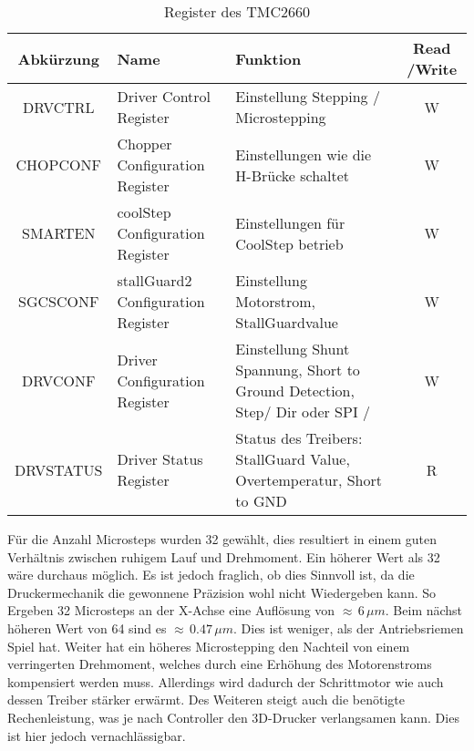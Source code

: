 \begin{table}[h]
	\small
		\begin{center}
		\def\arraystretch{1.3} \tabcolsep=10pt
			\begin{tabular}{|c|C{4cm}|C{5cm}|c|}
				\hline
				Abkürzung	 & 	Name	 & 	Funktion	 & 	Read /Write\\ \hline
				DRVCTRL	 & 	Driver Control Register	 & 	Einstellung Stepping / Microstepping 	 & 	W\\ \hline
				CHOPCONF	 & 	Chopper Configuration Register	 & 	Einstellungen wie die H-Brücke schaltet	 & 	W\\ \hline
				SMARTEN	 & 	coolStep Configuration Register	 & 	Einstellungen für CoolStep betrieb	 & 	W\\ \hline
				SGCSCONF	 & 	stallGuard2 Configuration Register	 & 	Einstellung Motorstrom, StallGuardvalue	 & 	W\\ \hline
				DRVCONF	 & 	Driver Configuration Register	 & 	Einstellung  Shunt Spannung, Short to Ground Detection, Step/		Dir oder SPI / 	 & 	W\\ \hline
				DRVSTATUS	 & 	Driver Status Register	 & 	Status des Treibers: StallGuard Value, Overtemperatur, Short to GND	 & 	R \\ \hline
			\end{tabular} 
		\end{center}
		\caption{Register des TMC2660}
		\label{tab:RegisterTMC}
\end{table}
	
	
Für die Anzahl Microsteps wurden 32 gewählt, dies resultiert in einem guten Verhältnis zwischen ruhigem Lauf und Drehmoment. Ein höherer Wert als 32 wäre durchaus möglich. Es ist jedoch fraglich, ob dies Sinnvoll ist, da die Druckermechanik die gewonnene Präzision wohl nicht Wiedergeben kann. So Ergeben 32 Microsteps an der X-Achse eine Auflösung von $\approx\, 6 \,\si{\mu m}$. Beim nächst höheren Wert von 64 sind es $\approx\, 0.47 \,\si{\mu m}$. Dies ist weniger, als der Antriebsriemen Spiel hat. Weiter hat ein höheres Microstepping  den Nachteil von einem verringerten Drehmoment, welches durch eine Erhöhung des Motorenstroms kompensiert werden muss. Allerdings wird dadurch der Schrittmotor wie auch dessen Treiber stärker erwärmt. Des Weiteren steigt auch die benötigte Rechenleistung, was je nach Controller den 3D-Drucker verlangsamen kann. Dies ist hier jedoch vernachlässigbar.

 
